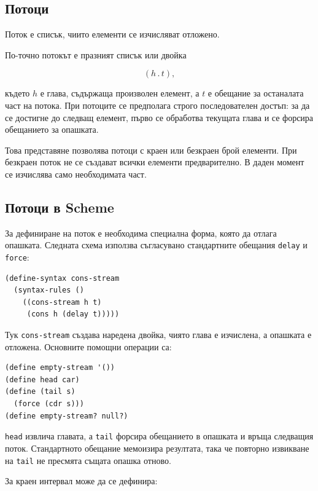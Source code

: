 \subsection{Потоци}\label{s:20.5.2}

\begin{defn}
Поток е списък, чиито елементи се изчисляват отложено.
\end{defn}

По-точно потокът е празният списък или двойка

\[
(h\mathbin{.}t),
\]

където $h$ е глава, съдържаща произволен елемент, а $t$ е обещание за останалата част на потока. При потоците се предполага строго последователен достъп: за да се достигне до следващ елемент, първо се обработва текущата глава и се форсира обещанието за опашката.

Това представяне позволява потоци с краен или безкраен брой елементи. При безкраен поток не се създават всички елементи предварително. В даден момент се изчислява само необходимата част.

\subsection{Потоци в Scheme}\label{s:20.5.3}

За дефиниране на поток е необходима специална форма, която да отлага опашката. Следната схема използва съгласувано стандартните обещания \texttt{delay} и \texttt{force}:

\begin{verbatim}
(define-syntax cons-stream
  (syntax-rules ()
    ((cons-stream h t)
     (cons h (delay t)))))
\end{verbatim}

Тук \texttt{cons-stream} създава наредена двойка, чиято глава е изчислена, а опашката е отложена. Основните помощни операции са:

\begin{verbatim}
(define empty-stream '())
(define head car)
(define (tail s)
  (force (cdr s)))
(define empty-stream? null?)
\end{verbatim}

\texttt{head} извлича главата, а \texttt{tail} форсира обещанието в опашката и връща следващия поток. Стандартното обещание мемоизира резултата, така че повторно извикване на \texttt{tail} не пресмята същата опашка отново.

За краен интервал може да се дефинира:

